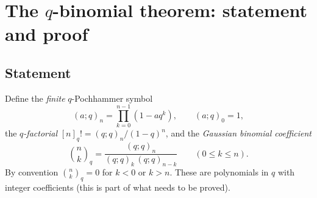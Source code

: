 


\section{The $q$-binomial theorem: statement and proof}
\label{sec:qbin-proof}

\subsection{Statement}

Define the \emph{finite} $q$-Pochhammer symbol
\[
(a; q)_n = \prod_{k=0}^{n-1} (1 - a q^k), \qquad (a; q)_0 = 1,
\]
the \emph{$q$-factorial} $[n]_q! = (q;q)_n / (1-q)^n$, and the \emph{Gaussian binomial coefficient}
\[
\binom{n}{k}_q = \frac{(q; q)_n}{(q; q)_k \, (q; q)_{n-k}} \qquad (0 \leq k \leq n).
\]
By convention $\binom{n}{k}_q = 0$ for $k < 0$ or $k > n$. These are polynomials in $q$ with integer coefficients (this is part of what needs to be proved).

